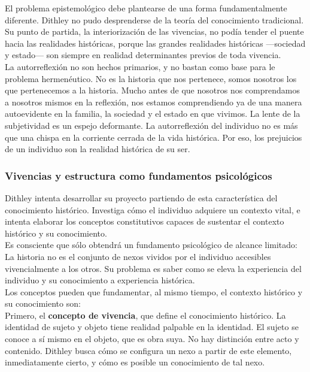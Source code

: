 \documentclass[a4paper, 11pt, twocolumn, spanish]{article}
\begin{document}
El problema epistemológico debe plantearse de una forma
fundamentalmente diferente. Dithley no pudo desprenderse de la teoría
del conocimiento tradicional. Su punto de partida, la interiorización
de las vivencias, no podía tender el puente hacia las realidades
históricas, porque las grandes realidades históricas —sociedad y
estado— son siempre en realidad determinantes previos de toda
vivencia.\\[0pt]
La autorreflexión no son hechos primarios, y no bastan como base para
le problema hermenéutico. No es la historia que nos pertenece, somos
nosotros los que pertenecemos a la historia. Mucho antes de que
nosotros nos comprendamos a nosotros mismos en la reflexión, nos
estamos comprendiendo ya de una manera autoevidente en la familia, la
sociedad y el estado en que vivimos. La lente de la subjetividad es un
espejo deformante. La autorreflexión del individuo no es más que una
chispa en la corriente cerrada de la vida histórica. Por eso, los
prejuicios de un individuo son la realidad histórica de su ser.


\subsubsection{Vivencias y estructura como fundamentos psicológicos}
\label{sec:orgc6c065c}
Dithley intenta desarrollar su proyecto partiendo de esta
característica del conocimiento histórico. Investiga cómo el individuo
adquiere un contexto vital, e intenta elaborar los conceptos
constitutivos capaces de sustentar el contexto histórico y su
conocimiento.\\[0pt]
Es consciente que sólo obtendrá un fundamento psicológico de alcance
limitado: La historia no es el conjunto de nexos vividos por el
individuo accesibles vivencialmente a los otros. Su problema es saber
como se eleva la experiencia del individuo y su conocimiento a
experiencia histórica.\\[0pt]
Los conceptos pueden que fundamentar, al mismo tiempo, el contexto
histórico y su conocimiento son:\\[0pt]
Primero, el \textbf{concepto de vivencia}, que define el conocimiento
histórico. La identidad de sujeto y objeto tiene realidad palpable en
la identidad. El sujeto se conoce a sí mismo en el objeto, que es obra
suya. No hay distinción entre acto y contenido. Dithley busca cómo se
configura un nexo a partir de este elemento, inmediatamente cierto, y
cómo es posible un conocimiento de tal nexo.\\[0pt]
\end{document}
